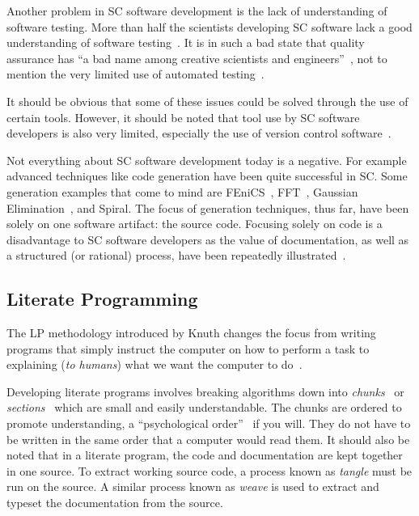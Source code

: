 \documentclass{article}
\begin{document}
Another problem in SC software development is the lack of understanding of software testing. More than half the scientists developing SC software lack a good understanding of software testing~\cite{Merali2010}. It is in such a bad state that quality assurance has ``a bad name among creative scientists and engineers''~\cite[p.~352]{Roache1998}, not to mention the very limited use of automated testing~\cite{PatrickEtAl2015}.

It should be obvious that some of these issues could be solved through the use of certain tools. However, it should be noted that tool use by SC software developers is also very limited, especially the use of version control software~\cite{Wilson2006}.

Not everything about SC software development today is a negative. For example advanced techniques like code generation have been quite successful in SC. Some generation examples that come to mind are FEniCS~\cite{LoggEtAl2012}, FFT~\cite{KiselyovEtAl2004}, Gaussian Elimination~\cite{Carette2006}, and Spiral. The focus of generation techniques, thus far, have been solely on one software artifact: the source code. Focusing solely on code is a disadvantage to SC software developers as the value of documentation, as well as a structured (or rational) process, have been repeatedly illustrated~\cite{SmithAndKoothoor2016, SmithEtAl2015-SS-TR, SmithEtAl2015SQJ, SmithEtAl2013}.

\subsection{Literate Programming}

The LP methodology introduced by Knuth changes the focus from writing programs that simply instruct the computer on how to perform a task to explaining (\emph{to humans}) what we want the computer to do~\cite{Knuth1984}.

Developing literate programs involves breaking algorithms down into \emph{chunks}~\cite{JohnsonAndJohnson1997} or \emph{sections}~\cite{Knuth1984} which are small and easily understandable. The chunks are ordered to promote understanding, a ``psychological order''~\cite{PieterseKourieAndBoake2004} if you will. They do not have to be written in the same order that a computer would read them. It should also be noted that in a literate program, the code and documentation are kept together in one source. To extract working source code, a process known as \emph{tangle} must be run on the source. A similar process known as \emph{weave} is used to extract and typeset the documentation from the source.
\end{document}
